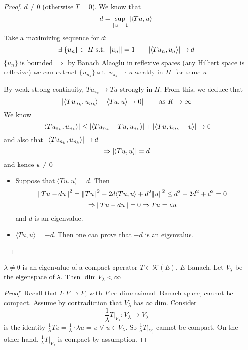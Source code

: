 \begin{proof}
    \(d \neq 0\) (otherwise \(T=0\)). We know that
    \[
        d = \sup_{\norm{u}=1} \abs{\langle Tu, u\rangle}
    \]
    Take a maximizing sequence for \(d\):
    \[
        \exists \; \{u_n\} \subset H \text{ s.t. } \norm{u_n}=1 \qquad \abs{\langle Tu_n, u_n\rangle} \to d    
    \]
    \(\{u_n\}\) is bounded \(\Rightarrow\) by Banach Alaoglu in reflexive spaces (any Hilbert space is reflexive) we can extract \(\{u_{n_k}\}\) s.t. \(u_{n_k} \rightharpoonup u\) weakly in \(H\), for some \(u\).

    By weak strong continuity, \(T u_{n_k} \to Tu\) strongly in \(H\). From this, we deduce that 
    \[
        \abs{ \langle T u_{n_k}, u_{n_k}\rangle - \langle Tu, u\rangle \to 0} \qquad \text{ as } K \to \infty    
    \]
    We know
    \[
        \abs{ \langle Tu_{n_k}, u_{n_k}\rangle} \leq \abs{\langle T u_{n_k} - Tu, u_{n_k}\rangle} + \abs{ \langle Tu, u_{n_k} - u\rangle} \to 0
    \]
    and also that \(\abs{\langle T u_{n_k}, u_{n_k}\rangle} \to d\)
    \[
        \Rightarrow \abs{\langle Tu, u\rangle} = d
    \]
    and hence \(u \neq 0\)

    \begin{itemize}
        \item Suppose that \(\langle Tu, u\rangle = d\). Then
        \[
            \norm{Tu- du}^2 = \norm{Tu}^2 - 2d \langle Tu, u\rangle + d^2 \norm{u}^2 \leq d^2 - 2d^2 + d^2 = 0
        \]
        \[
            \Rightarrow \norm{Tu - du} = 0 \Rightarrow Tu = du
        \]
        and \(d\) is an eigenvalue.
        \item \(\langle Tu, u\rangle = -d\). Then one can prove that \(-d\) is an eigenvalue.
    \end{itemize}
\end{proof}

\begin{proposition}
    \(\lambda \neq 0\) is an eigenvalue of a compact operator \(T \in \mathcal{K}(E)\), \(E \) Banach. Let \(V_\lambda\) be the eigenspace of \(\lambda\). Then \(\dim V_\lambda < \infty\)
\end{proposition}
\begin{proof}
    Recall that \(I: F \to F \), with \(F  \; \infty\) dimensional. Banach space, cannot be compact. Assume by contradiction that \(V_\lambda\) has \(\infty\) dim. Consider
    \[
        \frac{1}{\lambda} T |_{V_\lambda}: V_\lambda \to V_\lambda 
    \]
    is the identity \(\frac{1}{\lambda} T u = \frac{1}{\lambda} \cdot \lambda u = u\) \(\forall\; u \in V_\lambda\). 
    So \(\frac{1}{\lambda} T |_{V_\lambda}\) cannot be compact. On the other hand, \(\frac{1}{\lambda} T |_{V_\lambda}\) is compact by assumption.
\end{proof}


